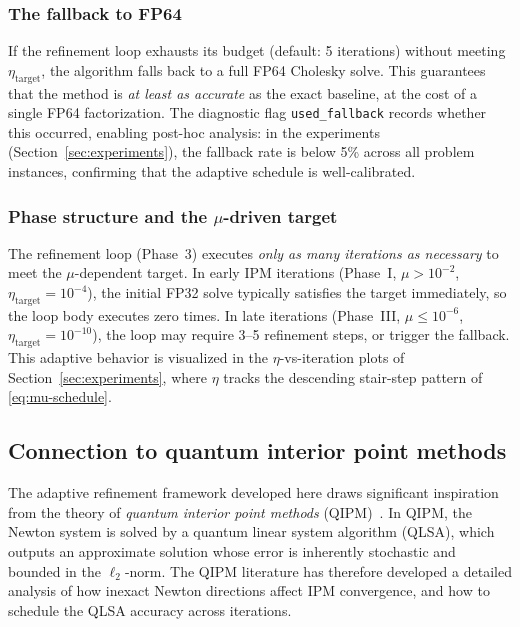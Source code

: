 \documentclass[11pt,twoside]{article}
\begin{document}
\subsubsection{The fallback to FP64}

If the refinement loop exhausts its budget (default: 5 iterations) without
meeting $\eta_{\text{target}}$, the algorithm falls back to a full FP64
Cholesky solve.  This guarantees that the method is \emph{at least as
accurate} as the exact baseline, at the cost of a single FP64
factorization.  The diagnostic flag \texttt{used\_fallback} records
whether this occurred, enabling post-hoc analysis: in the experiments
(Section~\ref{sec:experiments}), the fallback rate is below 5\% across all
problem instances, confirming that the adaptive schedule is well-calibrated.

\subsubsection{Phase structure and the $\mu$-driven target}

The refinement loop (Phase~3) executes \emph{only as many iterations as
necessary} to meet the $\mu$-dependent target.  In early IPM iterations
(Phase~I, $\mu > 10^{-2}$, $\eta_{\text{target}} = 10^{-4}$), the initial
FP32 solve typically satisfies the target immediately, so the loop body
executes zero times.  In late iterations (Phase~III, $\mu \le 10^{-6}$,
$\eta_{\text{target}} = 10^{-10}$), the loop may require 3--5 refinement
steps, or trigger the fallback.  This adaptive behavior is visualized in
the $\eta$-vs-iteration plots of Section~\ref{sec:experiments}, where
$\eta$ tracks the descending stair-step pattern of
\eqref{eq:mu-schedule}.

\subsection{Connection to quantum interior point methods}
\label{sec:qipm-connection}

The adaptive refinement framework developed here draws significant
inspiration from the theory of \emph{quantum interior point methods}
(QIPM)~\cite{Kerenidis2020}.  In QIPM, the Newton system is solved by a
quantum linear system algorithm (QLSA), which outputs an approximate
solution whose error is inherently stochastic and bounded in the
$\ell_2$-norm.  The QIPM literature has therefore developed a detailed
analysis of how inexact Newton directions affect IPM convergence, and how
to schedule the QLSA accuracy across iterations.
\end{document}

